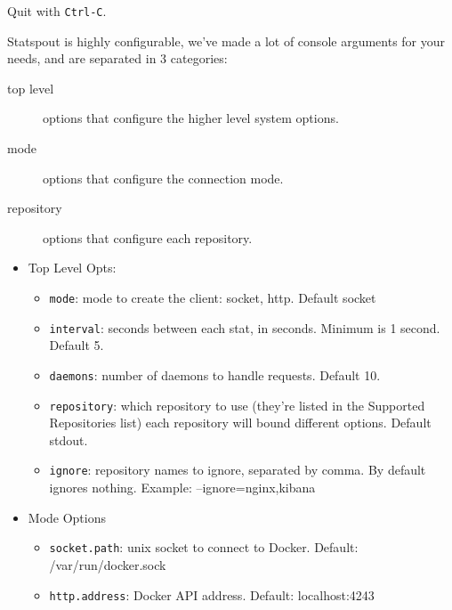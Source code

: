 Quit with \texttt{Ctrl-C}.

Statspout is highly configurable, we've made a lot of console arguments for your needs, and are separated in 3 categories:

\begin{description}
  \item[top level]
      options that configure the higher level system options.
      
  \item[mode]
      options that configure the connection mode.
      
  \item[repository]
      options that configure each repository.
\end{description}

\begin{itemize}
    \item
        Top Level Opts:
        \begin{itemize}
            \item \texttt{mode}: mode to create the client: socket, http. Default socket
            
            \item \texttt{interval}: seconds between each stat, in seconds. Minimum is 1 second. Default 5.
            
            \item \texttt{daemons}: number of daemons to handle requests. Default 10.
            
            \item \texttt{repository}: which repository to use (they're listed in the Supported Repositories list) each repository will bound different options. Default stdout.

            \item \texttt{ignore}: repository names to ignore, separated by comma. By default ignores nothing. Example: --ignore=nginx,kibana
        \end{itemize}
    
    \item 
        Mode Options
        
        \begin{itemize}
            \item \texttt{socket.path}: unix socket to connect to Docker. Default: /var/run/docker.sock
            
            \item \texttt{http.address}: Docker API address. Default: localhost:4243
        \end{itemize}
    

\end{itemize}

